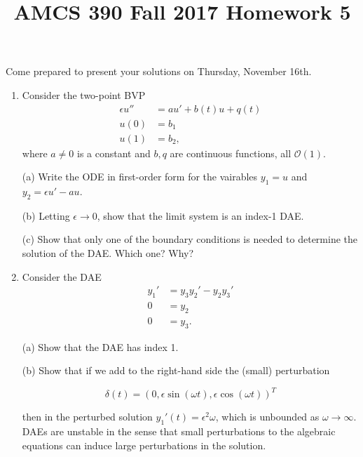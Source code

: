 \documentclass[12pt]{article}
\title{AMCS 390 Fall 2017 Homework 5}
\begin{document}
\date{}
\maketitle

Come prepared to present your solutions on Thursday, November 16th.

\begin{enumerate}

    \item Consider the two-point BVP
        \begin{align*}
            \epsilon u'' & = a u' + b(t)u + q(t) \\
            u(0) & = b_1 \\
            u(1) & = b_2,
        \end{align*}
        where $a\ne0$ is a constant and $b, q$ are continuous functions, all
        ${\mathcal O}(1)$.

        (a) Write the ODE in first-order form for the vairables $y_1=u$ and
            $y_2 = \epsilon u' - au$.
        
        (b) Letting $\epsilon \to 0$, show that the limit system is an index-1 DAE.

        (c) Show that only one of the boundary conditions is needed to
            determine the solution of the DAE.  Which one?  Why?

    \item Consider the DAE
        \begin{align*}
            y_1' & = y_3 y_2' - y_2 y_3' \\
            0 & = y_2 \\
            0 & = y_3.
        \end{align*}
    
        (a) Show that the DAE has index 1.

        (b) Show that if we add to the right-hand side the (small) perturbation

                $$\delta(t) = (0, \epsilon\sin(\omega t), \epsilon\cos(\omega t))^T$$

            then in the perturbed solution $y_1'(t) = \epsilon^2 \omega$, which is unbounded
            as $\omega \to \infty$.  DAEs are unstable in the sense that small perturbations
            to the algebraic equations can induce large perturbations in the solution.
\end{enumerate}
\end{document}
